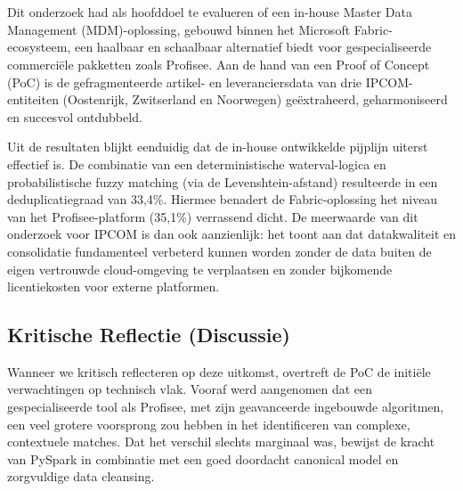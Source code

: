 
\chapter{}%
\label{ch:conclusie}


Dit onderzoek had als hoofddoel te evalueren of een in-house Master Data Management (MDM)-oplossing, gebouwd binnen het Microsoft Fabric-ecosysteem, een haalbaar en schaalbaar alternatief biedt voor gespecialiseerde commerciële pakketten zoals Profisee. Aan de hand van een Proof of Concept (PoC) is de gefragmenteerde artikel- en leveranciersdata van drie IPCOM-entiteiten (Oostenrijk, Zwitserland en Noorwegen) geëxtraheerd, geharmoniseerd en succesvol ontdubbeld. 

Uit de resultaten blijkt eenduidig dat de in-house ontwikkelde pijplijn uiterst effectief is. De combinatie van een deterministische waterval-logica en probabilistische fuzzy matching (via de Levenshtein-afstand) resulteerde in een deduplicatiegraad van 33,4\%. Hiermee benadert de Fabric-oplossing het niveau van het Profisee-platform (35,1\%) verrassend dicht. De meerwaarde van dit onderzoek voor IPCOM is dan ook aanzienlijk: het toont aan dat datakwaliteit en consolidatie fundamenteel verbeterd kunnen worden zonder de data buiten de eigen vertrouwde cloud-omgeving te verplaatsen en zonder bijkomende licentiekosten voor externe platformen.

\section*{Kritische Reflectie (Discussie)}

Wanneer we kritisch reflecteren op deze uitkomst, overtreft de PoC de initiële verwachtingen op technisch vlak. Vooraf werd aangenomen dat een gespecialiseerde tool als Profisee, met zijn geavanceerde ingebouwde algoritmen, een veel grotere voorsprong zou hebben in het identificeren van complexe, contextuele matches. Dat het verschil slechts marginaal was, bewijst de kracht van PySpark in combinatie met een goed doordacht canonical model en zorgvuldige data cleansing. 

